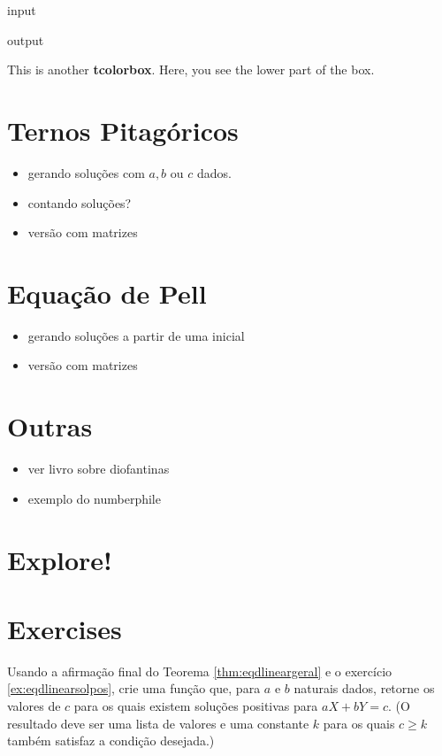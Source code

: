\begin{sageinput}
input
\end{sageinput}
\begin{sageoutput}
output
\end{sageoutput}


\begin{tcolorbox}[colback=red!5,colframe=red!75!black,title=My nice heading]
This is another \textbf{tcolorbox}.
\tcblower
Here, you see the lower part of the box.
\end{tcolorbox}

\section{Ternos Pitagóricos}
\begin{itemize}
  \item gerando soluções com $a,b$ ou $c$ dados.
  \item contando soluções?
  \item versão com matrizes
\end{itemize}

\section{Equação de Pell}
\begin{itemize}
  \item gerando soluções a partir de uma inicial
  \item versão com matrizes
\end{itemize}

\section{Outras}
\begin{itemize}
  \item ver livro sobre diofantinas
  \item exemplo do numberphile
\end{itemize}


\section{Explore!}

\section{Exercises}

\begin{exercise}
  Usando a afirmação final do Teorema \ref{thm:eqdlineargeral}
  e o exercício \ref{ex:eqdlinearsolpos}, crie uma função que,
  para $a$ e $b$ naturais dados, retorne os valores de $c$ para os quais
  existem soluções positivas para $aX + bY = c$. (O resultado
  deve ser uma lista de valores e uma constante $k$ para os quais $c\geq k$
  também satisfaz a condição desejada.)
\end{exercise}